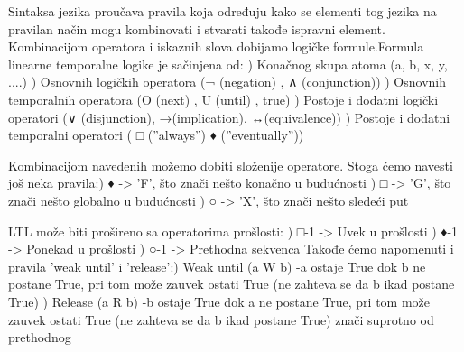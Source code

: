 \documentclass[a4paper]{article}
\begin{document}
{Sintaksa jezika proučava pravila koja određuju kako se elementi tog jezika na pravilan način mogu kombinovati i stvarati takođe ispravni element. Kombinacijom operatora i iskaznih slova dobijamo logičke formule.\newline\newline Formula linearne temporalne logike je sačinjena od: \newline {}) Konačnog skupa atoma (a, b, x, y, ....) ) Osnovnih logičkih operatora (¬ (negation) , ∧ (conjunction)) ) Osnovnih temporalnih operatora (O (next) , U (until) , true) ) Postoje i dodatni logički operatori (∨ (disjunction), →(implication), ↔(equivalence)) ) Postoje i dodatni temporalni operatori ( □ (”always”) ♦ (”eventually”)) \newline

	Kombinacijom navedenih možemo dobiti složenije operatore. Stoga ćemo navesti još neka pravila:\newline {}) ♦ -> 'F', što znači nešto konačno u budućnosti ) □ -> 'G', što znači nešto globalno u budućnosti ) ○ -> 'X', što znači nešto sledeći put \newline

	LTL može biti prošireno sa operatorima prošlosti: \newline {}) □-1 -> Uvek u prošlosti ) ♦-1 -> Ponekad u prošlosti ) ○-1 -> Prethodna sekvenca \newline\newline
		Takođe ćemo napomenuti i pravila 'weak until' i 'release':) Weak until (a W b) \newline
		-a ostaje True dok b ne postane True, pri tom može zauvek ostati True (ne zahteva se da b ikad postane True) ) Release (a R b) \newline
		-b ostaje True dok a ne postane True, pri tom može zauvek ostati True (ne zahteva se da b ikad postane True) znači suprotno od prethodnog \newline

}
\end{document}
